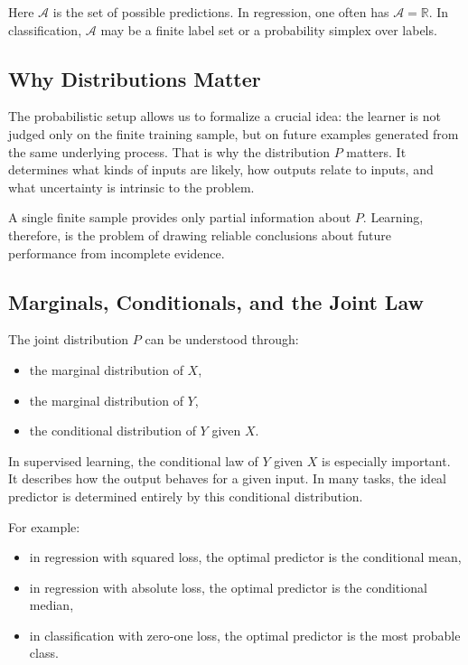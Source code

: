 Here $\mathcal{A}$ is the set of possible predictions. In regression, one often has $\mathcal{A}=\mathbb{R}$. In classification, $\mathcal{A}$ may be a finite label set or a probability simplex over labels.

\subsection{Why Distributions Matter}

The probabilistic setup allows us to formalize a crucial idea: the learner is not judged only on the finite training sample, but on future examples generated from the same underlying process. That is why the distribution $P$ matters. It determines what kinds of inputs are likely, how outputs relate to inputs, and what uncertainty is intrinsic to the problem.

A single finite sample provides only partial information about $P$. Learning, therefore, is the problem of drawing reliable conclusions about future performance from incomplete evidence.

\subsection{Marginals, Conditionals, and the Joint Law}

The joint distribution $P$ can be understood through:
\begin{itemize}
    \item the marginal distribution of $X$,
    \item the marginal distribution of $Y$,
    \item the conditional distribution of $Y$ given $X$.
\end{itemize}

In supervised learning, the conditional law of $Y$ given $X$ is especially important. It describes how the output behaves for a given input. In many tasks, the ideal predictor is determined entirely by this conditional distribution.

For example:
\begin{itemize}
    \item in regression with squared loss, the optimal predictor is the conditional mean,
    \item in regression with absolute loss, the optimal predictor is the conditional median,
    \item in classification with zero-one loss, the optimal predictor is the most probable class.
\end{itemize}


